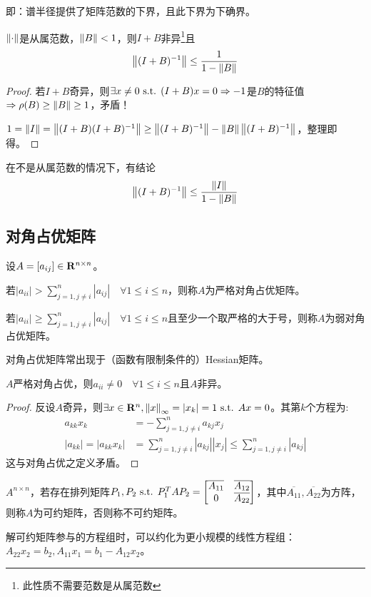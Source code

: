 \documentclass{ctexart}
\begin{document}
即：谱半径提供了矩阵范数的下界，且此下界为下确界。

\begin{Thm}
$\left\|\cdot\right\|$是从属范数，$\left\|B\right\|<1$，则$I+B$非异\footnote{此性质不需要范数是从属范数}且
\[\left\|(I+B)^{-1}\right\|\leq\frac{1}{1-\left\|B\right\|}\]
\end{Thm}
\begin{proof}
若$I+B$奇异，则$\exists x\neq 0\text{ s.t. } (I+B)x=0\Rightarrow -1$是$B$的特征值$\Rightarrow \rho(B)\geq \left\|B\right\|\geq 1$，矛盾！

$1=\left\|I\right\|=\left\|(I+B)(I+B)^{-1}\right\|\geq \left\|(I+B)^{-1}\right\|-\left\|B\right\|\left\|(I+B)^{-1}\right\|$，整理即得。
\end{proof}

在不是从属范数的情况下，有结论\[\left\|(I+B)^{-1}\right\|\leq\frac{\left\|I\right\|}{1-\left\|B\right\|}\]

\subsection{对角占优矩阵}
\begin{Def}
设$A=[a_{ij}]\in\mathbf{R}^{n\times n}$。

若$|a_{ii}|>\sum\limits_{j=1,j\neq i}^n|a_{ij}|\quad \forall 1\leq i\leq n$，则称$A$为严格对角占优矩阵。

若$|a_{ii}|\geq\sum\limits_{j=1,j\neq i}^n|a_{ij}|\quad \forall 1\leq i\leq n$且至少一个取严格的大于号，则称$A$为弱对角占优矩阵。
\end{Def}

对角占优矩阵常出现于（函数有限制条件的）Hessian矩阵。

\begin{Thm}
$A$严格对角占优，则$a_{ii}\neq 0\quad\forall 1\leq i\leq n$且$A$非异。
\end{Thm}
\begin{proof}
反设$A$奇异，则$\exists x\in\mathbf{R}^n, \left\|x\right\|_\infty=|x_k|=1\text{ s.t. } Ax=0$。其第$k$个方程为:
\begin{align*}
a_{kk}x_k&=-\sum_{j=1,j\neq i}^n a_{kj}x_j\\
|a_{kk}|=|a_{kk}x_k|&=\sum_{j=1,j\neq i}^n |a_{kj}||x_j|\leq\sum_{j=1,j\neq i}^n |a_{kj}|
\end{align*}
这与对角占优之定义矛盾。
\end{proof}

\begin{Def}
$A^{n\times n}$，若存在排列矩阵$P_1,P_2\text{ s.t. } P_1^TAP_2=\begin{bmatrix}\overline{A_{11}}&\overline{A_{12}}\\0&\overline{A_{22}}\end{bmatrix}$，其中$\overline{A_{11}},\overline{A_{22}}$为方阵，则称$A$为可约矩阵，否则称不可约矩阵。
\end{Def}
解可约矩阵参与的方程组时，可以约化为更小规模的线性方程组：$A_{22}x_2=b_2,A_{11}x_1=b_1-A_{12}x_2$。
\end{document}
